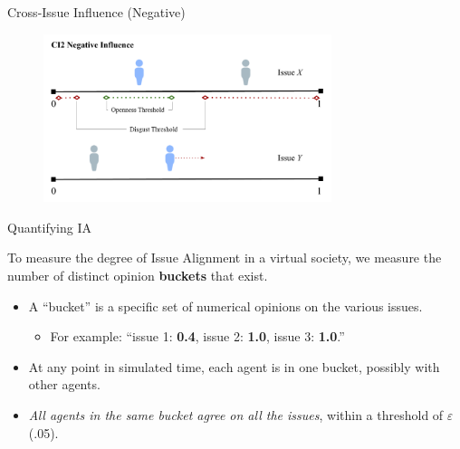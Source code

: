 \documentclass[12pt]{beamer}
\begin{document}
\begin{frame}[c]{Cross-Issue Influence (Negative)}  %



\begin{figure}
	\includegraphics[width=0.75\textwidth]{images/CI2Negative.png}
\end{figure}

\end{frame}
\begin{frame}[c]{Quantifying IA} %

To measure the degree of Issue Alignment in a virtual society, we measure the
number of distinct opinion \textbf{buckets} that exist.

\bigskip
\pause
\begin{itemize}
\itemsep.1em

\item A ``bucket'' is a specific set of numerical opinions on the various issues.
\begin{itemize}
\itemsep.1em
\item For example: ``issue 1: \textbf{0.4}, issue 2: \textbf{1.0}, issue 3: \textbf{1.0}.''
\end{itemize}

\pause

\item At any point in simulated time, each agent is in one bucket, possibly with
other agents.

\pause
\item \textit{All agents in the same bucket agree on all the issues}, within a
threshold of $\varepsilon$ (.05).

\end{itemize}
\end{frame}
\end{document}
